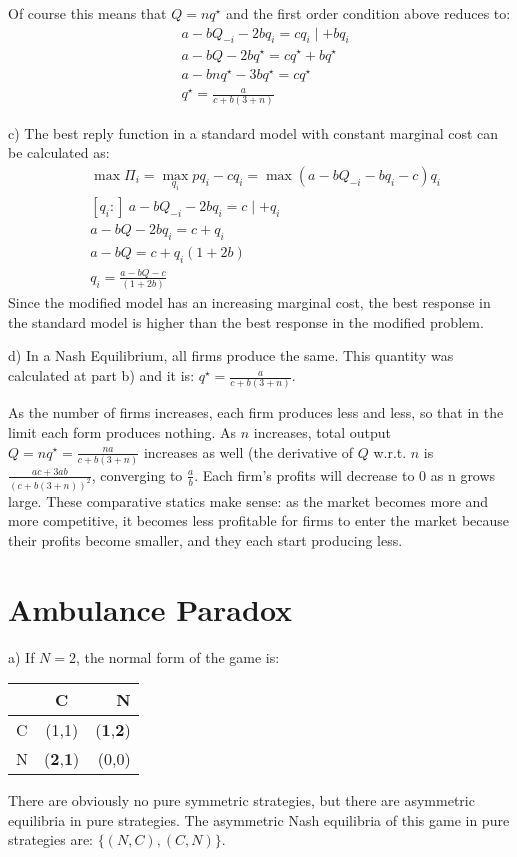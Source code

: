 \documentclass[letter,11pt]{article}
\begin{document}
Of course this means that $Q=n q^{\star}$ and the first order condition above reduces to:
\begin{align*}
& a-bQ_{-i} - 2b q_i = c q_i \mid +bq_i \\
& a-bQ  - 2b q^{\star} = c q^{\star}  +bq^{\star}\\
& a-b n q^{\star} - 3b q^{\star} = c q^{\star}  \\
& \boxed{ q^{\star} = \frac{a}{c+b(3+n)}}
\end{align*}

c) The best reply function in a standard model with constant marginal cost can be calculated as:
\begin{align*}
& \max \Pi_i = \max_{q_i} p q_i -  c q_i = \max (a-b Q_{-i} - b q_i -  c  ) q_i \\
& [q_i:] \ a-b Q_{-i} - 2b q_i = c \mid +q_i \\
& a-b Q  - 2b q_i = c  +q_i \\
& a-b Q  = c  +q_i(1+2b) \\
& \boxed{ q_i = \frac{a - bQ - c}{(1+2b)}}
\end{align*}
Since the modified model has an increasing marginal cost, the best response in the standard model is higher than the best response in the modified problem.

d) In a Nash Equilibrium, all firms produce the same. This quantity was calculated at part b) and it is: $ q^{\star} = \frac{a}{c+b(3+n)}$. 

As the number of firms increases, each firm produces less and less, so that in the limit each form produces nothing. As $n $ increases, total output  $Q = n q^{\star} =   \frac{n a}{c+b(3+n)}$ increases as well (the derivative of $Q$ w.r.t. $n$ is $\frac{ac + 3ab}{(c+b(3+n))^2}$, converging to $\frac{a}{b}$. Each firm's profits will decrease to $0$ as n grows large. These comparative statics make sense: as the market becomes more and more competitive, it becomes less profitable for firms to enter the market because their profits become smaller, and they each start producing less. 

\clearpage
\section{Ambulance Paradox}
\hfill

a) If $N=2$, the normal form of the game is:


\begin{center}
  \begin{tabular}{ | l | c | r |}
    \hline
     & C & N \\ \hline
    C & (1,1) & (\textbf{1},\textbf{2}) \\ \hline
   N & (\textbf{2},\textbf{1}) & (0,0) \\
    \hline
  \end{tabular}
\end{center}
There are obviously no pure symmetric strategies, but there are asymmetric equilibria in pure strategies. The asymmetric Nash equilibria of this game in pure strategies are: $\{(N,C) , (C,N) \}$.
\end{document}
